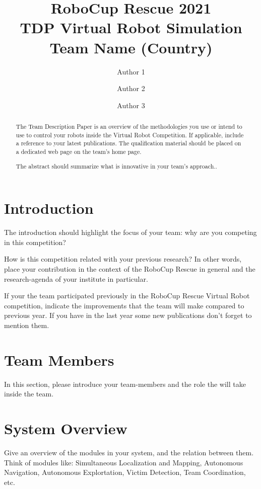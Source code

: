 \documentclass[runningheads,a4paper]{llncs}
\begin{document}
\title{RoboCup Rescue 2021\\
       TDP Virtual Robot Simulation\\
       Team Name (Country)}
\author{Author 1 \and Author 2 \and Author 3}
\maketitle
\begin{abstract}
The Team Description Paper is an overview of the methodologies you use or intend to use to control your robots inside the Virtual Robot Competition. If applicable, include a reference to your latest publications. The qualification material should be placed on a dedicated web page on the team's home page.

The abstract should summarize what is innovative in your team's approach..
\end{abstract}
\section{Introduction}
The introduction should highlight the focus of your team: why are you competing in this competition?

How is this competition related with your previous research? In other words, place your contribution in the context of the RoboCup Rescue in general and the research-agenda of your institute in particular.

If your the team participated previously in the RoboCup Rescue Virtual Robot competition, indicate the improvements that the team will make compared to previous year. If you have in the last year some new publications don't forget to mention them.
\section{Team Members}
In this section, please introduce your team-members and the role the will take inside the team.
\section{System Overview}
Give an overview of the modules in your system, and the relation between them. Think of modules like: Simultaneous Localization and Mapping, Autonomous Navigation, Autonomous Explortation, Victim Detection, Team Coordination, etc.
\end{document}
